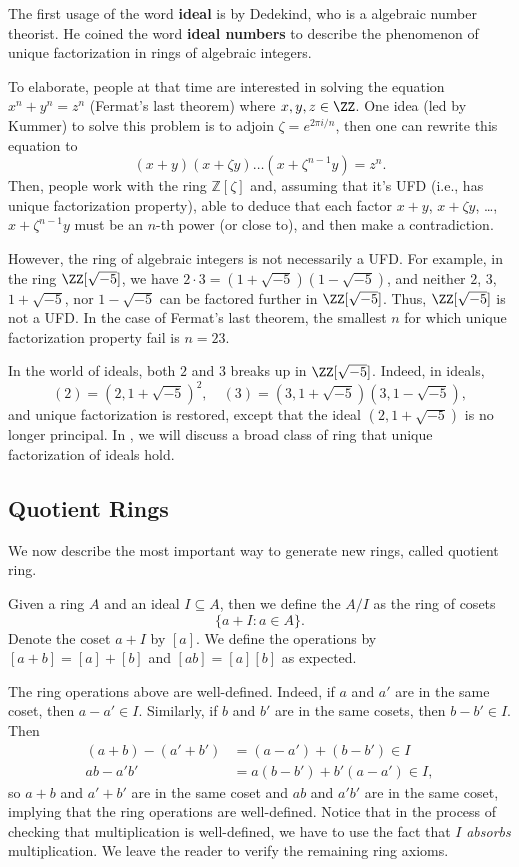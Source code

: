 \begin{remark}
The first usage of the word \textbf{ideal}
is by Dedekind, who is a algebraic number theorist.
He coined the word \textbf{ideal numbers}
to describe the phenomenon of
unique factorization in rings of algebraic integers.

To elaborate, people at that time are interested
in solving the equation $x^n+y^n=z^n$ (Fermat's last theorem)
where $x,y,z\in \ZZ$.
One idea (led by Kummer) to solve
this problem is to adjoin $\zeta = e^{2\pi i/n}$, then
one can rewrite this equation to 
$$(x+y)(x+\zeta y)\dots (x+\zeta^{n-1}y)=z^n.$$
Then, people work with the ring $\mathbb Z[\zeta]$
and, assuming that it's UFD (i.e., has unique factorization property), able to deduce that each factor $x+y$, $x+\zeta y$,
\dots, $x+\zeta^{n-1}y$ must be an $n$-th power
(or close to), and then make a contradiction.

However, the ring of algebraic integers is not necessarily a UFD. For example, in the ring $\ZZ[\sqrt{-5}]$, we have
$2\cdot 3 = (1+\sqrt{-5})(1-\sqrt{-5})$,
and neither $2$, $3$, $1+\sqrt{-5}$, nor $1-\sqrt{-5}$
can be factored further in $\ZZ[\sqrt{-5}]$.
Thus, $\ZZ[\sqrt{-5}]$ is not a UFD.
In the case of Fermat's last theorem, the smallest $n$
for which unique factorization property fail is $n=23$.

In the world of ideals, both $2$ and $3$ breaks up in $\ZZ[\sqrt{-5}]$.
Indeed, in ideals,
$$(2) = (2, 1+\sqrt{-5})^2,\quad (3) = (3, 1+\sqrt{-5})
(3, 1-\sqrt{-5}),$$
and unique factorization is restored, except that
the ideal $(2, 1+\sqrt{-5})$ is no longer principal.
In , we will discuss a broad class
of ring that unique factorization of ideals hold.
\end{remark}
\subsection{Quotient Rings}
We now describe the most important way to generate new rings,
called quotient ring.
\begin{definition}
Given a ring $A$ and an ideal $I\subseteq A$,
then we define the  $A/I$
as the ring of cosets 
$$\{a+I : a\in A\}.$$
Denote the coset $a+I$ by $[a]$. We define the operations by
$[a+b] = [a]+[b]$ and $[ab] = [a][b]$ 
as expected. 
\end{definition}
The ring operations above are well-defined.
Indeed, if $a$ and $a'$ are in the same coset, then 
$a-a'\in I$. Similarly, if $b$ and $b'$ are in the same cosets,
then $b-b'\in I$. Then 
\begin{align*}
(a+b)-(a'+b') &= (a-a')+(b-b') \in I \\
ab - a'b' &= a(b-b') + b'(a-a') \in I,
\end{align*}
so $a+b$ and $a'+b'$ are in the same coset
and $ab$ and $a'b'$ are in the same coset, implying that 
the ring operations are well-defined. 
Notice that in the process of checking that multiplication 
is well-defined, we have to use the fact that $I$ 
\emph{absorbs} multiplication.
We leave the reader to verify the remaining ring axioms.


